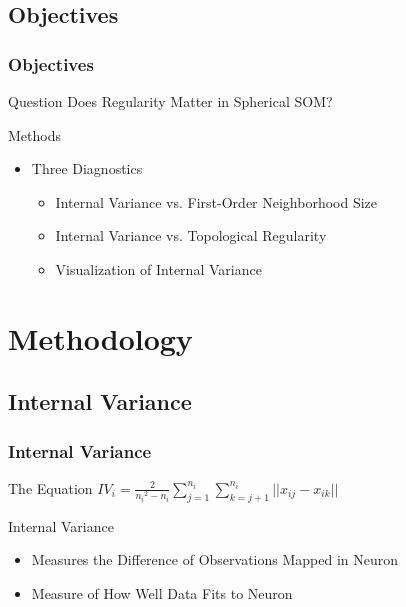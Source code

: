 \documentclass[nototal,handout]{beamer}
\begin{document}
\subsection{Objectives} 

\begin{frame}
	\frametitle{Objectives}
 
\begin{block}{Question}
  Does Regularity Matter in Spherical SOM?
 \end{block} 
\begin{block}{Methods}
 \begin{itemize}
 \item  Three Diagnostics
 \begin{itemize}
 \item  Internal Variance vs. First-Order Neighborhood Size
 \item  Internal Variance vs. Topological Regularity
 \item  Visualization of Internal Variance
 \end{itemize}
 \end{itemize}
 \end{block} \end{frame} 


\section{Methodology} 

\subsection{Internal Variance} 

\begin{frame}
	\frametitle{Internal Variance}
 
\begin{block}{The Equation}
  \({IV_i} = \frac{2}{{n_i}^2-{n_i}}\sum_{j=1}^{n_i}\sum_{k=j+1}^{n_i} ||{x_{ij}}-{x_{ik}}||\)
 \end{block} 
\begin{block}{Internal Variance}
 \begin{itemize}
 \item  Measures the Difference of Observations Mapped in Neuron
 \item  Measure of How Well Data Fits to Neuron
 \end{itemize}
 \end{block} \end{frame} 
\end{document}
